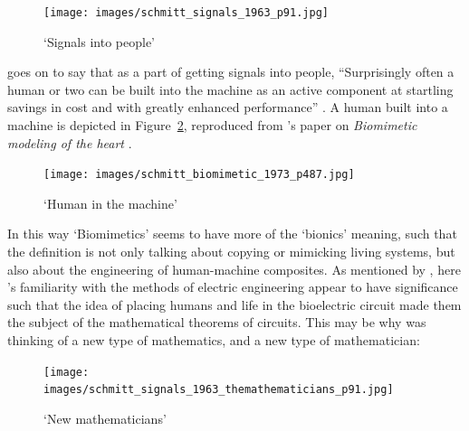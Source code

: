 \begin{figure}[H]
    \centering
    \texttt{[image: images/schmitt\_signals\_1963\_p91.jpg]}
    \caption{`Signals into people' \cite[p.~91]{schmitt_signals_1963}}
    \label{fig:schmitt:1963}
\end{figure}

\citeauthor{schmitt_signals_1963} goes on to say that as a part of getting signals into people, ``Surprisingly often a human or two can be built into the machine as an active component at startling savings in cost and with greatly enhanced performance'' \cite[p.~92]{schmitt_signals_1963}.  A human built into a machine is depicted in Figure~\ref{fig:schmitt:human_in_machine}, reproduced from \citeauthor{schmitt_biomimetic_1973}'s paper on \textit{Biomimetic modeling of the heart} \citep{schmitt_biomimetic_1973}.

\begin{figure}[H]
    \centering
    \texttt{[image: images/schmitt\_biomimetic\_1973\_p487.jpg]}
    \caption{`Human in the machine' \cite[p.~487]{schmitt_biomimetic_1973}}
    \label{fig:schmitt:human_in_machine}
\end{figure}

In this way `Biomimetics' seems to have more of the `bionics' meaning, such that the definition is not only talking about copying or mimicking living systems, but also about the engineering of human-machine composites. As mentioned by \citeauthor{ayre_biomimicry_2004}, here \citeauthor{schmitt_signals_1963}'s familiarity with the methods of electric engineering appear to have significance such that the idea of placing humans and life in the bioelectric circuit made them the subject of the mathematical theorems of circuits. This may be why \citeauthor{schmitt_signals_1963} was thinking of a new type of mathematics, and a new type of mathematician:

\begin{figure}[H]
    \centering
    \texttt{[image: images/schmitt\_signals\_1963\_themathematicians\_p91.jpg]}
    \caption{`New mathematicians' \cite[p.~91]{schmitt_signals_1963}}
    \label{fig:schmitt:1963:maths}
\end{figure}

